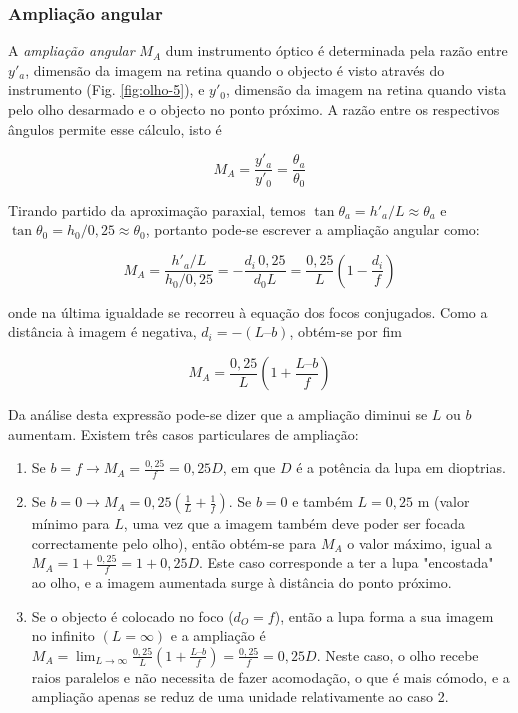 \documentclass[a4paper,12pt]{article}      %
\begin{document}
\subsubsection{ Ampliação angular}

A \emph{ampliação angular} $M_A$ dum instrumento óptico é determinada pela razão entre $y'_a$, dimensão da imagem na retina quando o objecto é visto através do instrumento (Fig. \ref{fig:olho-5}), e $y'_0$, dimensão da imagem na retina quando vista pelo olho desarmado e o objecto no ponto próximo. A razão entre os respectivos ângulos permite esse cálculo, isto é 

\begin{equation}
M_A=\frac{y'_a}{y'_0}=\frac{\theta_a}{\theta_0}
\end{equation}

Tirando partido da aproximação paraxial, temos $\tan\theta_a = h'_a / L \approx \theta_a$ e $\tan\theta_0 = h_0 / 0,25 \approx\theta_0$, portanto pode-se escrever a ampliação angular como:

\begin{equation}
M_A = \frac{h'_a/L}{h_0/0,25}=-\frac{d_i\,0,25}{d_0 L}= \frac{0,25}{L}\left(1-\frac{d_i}{f}\right) 
\end{equation}

onde na última igualdade se recorreu à equação dos focos conjugados. Como a distância à imagem é negativa, $d_i = - (L – b)$, obtém-se por fim

\begin{equation}
M_A = \frac{0,25}{L}\left(1+\frac{L–b}{f}\right)
\end{equation}

Da análise desta expressão pode-se dizer que a ampliação diminui se $L$ ou $b$ aumentam. Existem três casos particulares de ampliação:

\begin{enumerate}

\item  Se $b=f \to M_A = \frac{0,25}{f}=0,25D$, em que $D$ é a potência da lupa em dioptrias.

\item  Se $b=0\to M_A = 0,25\left(\frac{1}{L}+\frac{1}{f}\right)$.
Se $b= 0$ e também $L = 0,25 $ m (valor mínimo para $L$, uma vez que a imagem também deve poder ser focada correctamente pelo olho), então obtém-se para $M_A$ o valor máximo, igual a $M_A = 1+\frac{0,25}{f}= 1+0,25D$. Este caso corresponde a ter a lupa "encostada" ao olho, e a imagem aumentada surge à distância do ponto próximo.

\item  Se o objecto é colocado no foco ($d_O=f$), então a lupa forma a sua imagem no infinito $(L = \infty)$ e a ampliação é $M_A = \lim_{L\to\infty}\frac{0,25}{L}\left(1+\frac{L–b}{f}\right)= \frac{0,25}{f}=0,25D$. Neste caso, o olho recebe raios paralelos e não necessita de fazer acomodação, o que é mais cómodo, e a ampliação apenas se reduz de uma unidade relativamente ao caso 2.
\end{enumerate}
\end{document}
